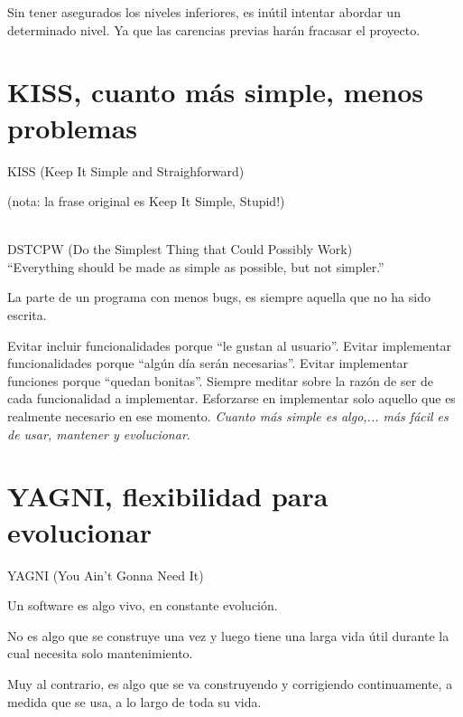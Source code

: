 \documentclass[spanish,12pt,a4paper,final,oneside]{book}
\begin{document}
Sin tener asegurados los niveles inferiores, es inútil intentar abordar un determinado nivel. Ya que las carencias previas harán fracasar el proyecto.




\section{KISS, cuanto más simple, menos problemas}
KISS (Keep It Simple and Straighforward) \begin{tiny}(nota: la frase original es Keep It Simple, Stupid!)\end{tiny}
\\DSTCPW (Do the Simplest Thing that Could Possibly Work)
\\``Everything should be made as simple as possible, but not simpler.''

La parte de un programa con menos bugs, es siempre aquella que no ha sido escrita.

Evitar incluir funcionalidades porque ``le gustan al usuario''. Evitar implementar funcionalidades porque ``algún día serán necesarias''. Evitar implementar funciones porque ``quedan bonitas''. Siempre meditar sobre la razón de ser de cada funcionalidad a implementar. Esforzarse en implementar solo aquello que es realmente necesario en ese momento. \textit{Cuanto más simple es algo,... más fácil es de usar, mantener y evolucionar}.

\section{YAGNI, flexibilidad para evolucionar}
YAGNI (You Ain’t Gonna Need It)

Un software es algo vivo, en constante evolución.

No es algo que se construye una vez y luego tiene una larga vida útil durante la cual necesita solo mantenimiento. 

Muy al contrario, es algo que se va construyendo y corrigiendo continuamente, a medida que se usa, a lo largo de toda su vida.
\end{document}
